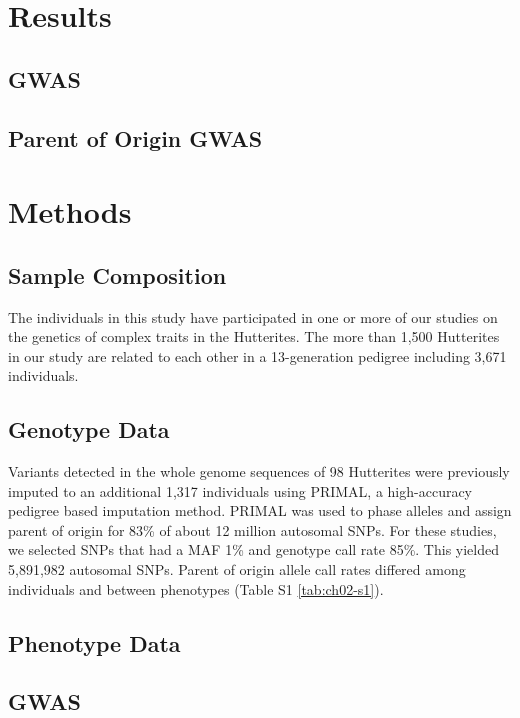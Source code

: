 \section{Results}\label{ch02-results}

\subsection{GWAS}\label{GWAS Results}


\subsection{Parent of Origin GWAS}\label{Parent of Origin GWAS}


\section{Methods}\label{ch02-methods}

\subsection{Sample Composition}\label{Sample Composition}
The individuals in this study have participated in one or more of our studies on the genetics of complex traits in the Hutterites\cite{Cusanovich:2016id,Weiss:2005cq,Abney2001}. The more than 1,500 Hutterites in our study are related to each other in a 13-generation pedigree including 3,671 individuals. 

\subsection{Genotype Data}\label{Genotype Data}
Variants detected in the whole genome sequences of 98 Hutterites were previously imputed to an additional 1,317 individuals using PRIMAL, a high-accuracy pedigree based imputation method\cite{Livne2015}. PRIMAL was used to phase alleles and assign parent of origin for 83\% of about 12 million autosomal SNPs. For these studies, we selected SNPs that had a MAF 1\% and genotype call rate 85\%. This yielded 5,891,982 autosomal SNPs. Parent of origin allele call rates differed among individuals and between phenotypes (Table S1 \ref{tab:ch02-s1}).

\subsection{Phenotype Data}\label{Phenotype Data}

\subsection{GWAS}\label{GWAS Methods}

